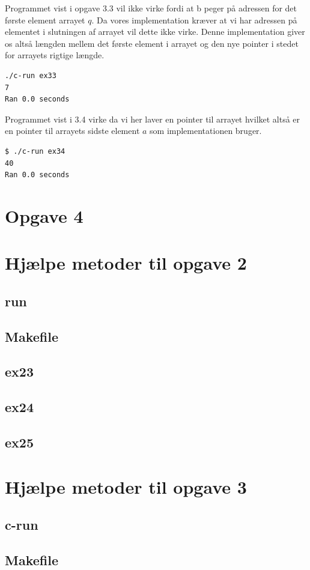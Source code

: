 \documentclass[danish,a4paper]{report}
\begin{document}
Programmet vist i opgave 3.3 vil ikke virke fordi at b peger på adressen for det første element arrayet $q$. Da vores implementation kræver at vi har adressen på elementet i slutningen af arrayet vil dette ikke virke. Denne implementation giver os altså længden mellem det første element i arrayet og den nye pointer i stedet for arrayets rigtige længde.


\begin{lstlisting}[language=bash]
./c-run ex33
7
Ran 0.0 seconds

\end{lstlisting}

Programmet vist i 3.4 virke da vi her laver en pointer til arrayet hvilket altså er en pointer til arrayets sidste element $a$ som implementationen bruger.

\begin{lstlisting}[language=bash]
$ ./c-run ex34
40
Ran 0.0 seconds
\end{lstlisting}

\chapter*{Opgave 4}

\appendix
\chapter{Hjælpe metoder til opgave 2}
\section*{run}

\section*{Makefile}

\section*{ex23}

\section*{ex24}

\section*{ex25}


\chapter{Hjælpe metoder til opgave 3}
\section*{c-run}

\section*{Makefile}

\label{LastPage}
\end{document}
